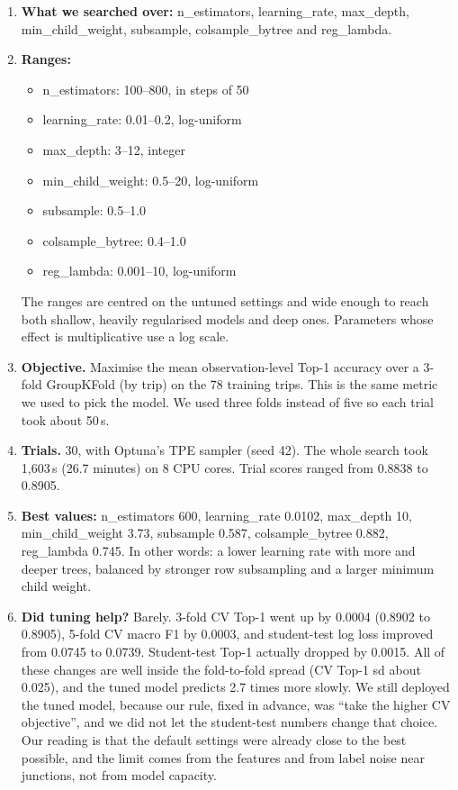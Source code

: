 \documentclass[11pt,a4paper]{article}
\begin{document}
\begin{enumerate}
  \item \textbf{What we searched over:} n\_estimators, learning\_rate, max\_depth, min\_child\_weight,
        subsample, colsample\_bytree and reg\_lambda.
  \item \textbf{Ranges:}
  \begin{itemize}
    \item n\_estimators: 100--800, in steps of 50
    \item learning\_rate: 0.01--0.2, log-uniform
    \item max\_depth: 3--12, integer
    \item min\_child\_weight: 0.5--20, log-uniform
    \item subsample: 0.5--1.0
    \item colsample\_bytree: 0.4--1.0
    \item reg\_lambda: 0.001--10, log-uniform
  \end{itemize}
  The ranges are centred on the untuned settings and wide enough to reach both shallow, heavily regularised
  models and deep ones. Parameters whose effect is multiplicative use a log scale.
  \item \textbf{Objective.} Maximise the mean observation-level Top-1 accuracy over a 3-fold GroupKFold (by
        trip) on the 78 training trips. This is the same metric we used to pick the model. We used three folds
        instead of five so each trial took about 50\,s.
  \item \textbf{Trials.} 30, with Optuna's TPE sampler (seed 42). The whole search took 1,603\,s (26.7
        minutes) on 8 CPU cores. Trial scores ranged from 0.8838 to 0.8905.
  \item \textbf{Best values:} n\_estimators 600, learning\_rate 0.0102, max\_depth 10, min\_child\_weight 3.73,
        subsample 0.587, colsample\_bytree 0.882, reg\_lambda 0.745. In other words: a lower learning rate
        with more and deeper trees, balanced by stronger row subsampling and a larger minimum child weight.
  \item \textbf{Did tuning help?} Barely. 3-fold CV Top-1 went up by 0.0004 (0.8902 to 0.8905), 5-fold CV
        macro F1 by 0.0003, and student-test log loss improved from 0.0745 to 0.0739. Student-test Top-1
        actually dropped by 0.0015. All of these changes are well inside the fold-to-fold spread (CV Top-1 sd
        about 0.025), and the tuned model predicts 2.7 times more slowly. We still deployed the tuned model,
        because our rule, fixed in advance, was ``take the higher CV objective'', and we did not let the
        student-test numbers change that choice. Our reading is that the default settings were already close to
        the best possible, and the limit comes from the features and from label noise near junctions, not from
        model capacity.
\end{enumerate}
\end{document}
